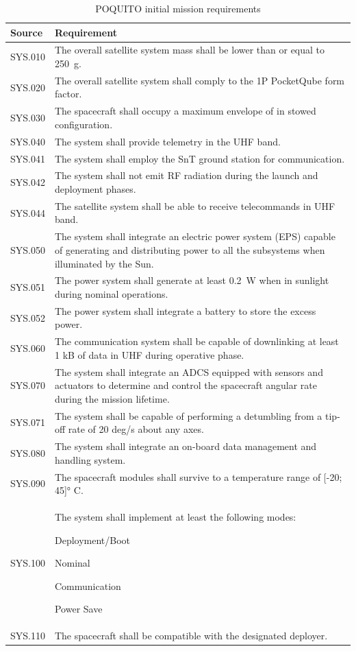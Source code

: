 \documentclass[a4paper,nobib,justified,final]{tufte-book}
\begin{document}
\begin{table}[htb]
	\begin{tabularx}{\linewidth}{@{}lX@{}}
		\toprule
		Source  & Requirement                                                                            \\ \midrule
		SYS.010 & The overall satellite system mass shall be lower than or equal to \qty{250}{\gram}.\\
		SYS.020 & The overall satellite system shall comply to the 1P PocketQube form factor.\\
		SYS.030 & The spacecraft shall occupy a maximum envelope of \qtyproduct{64 x 58 x 51.6}{\milli\meter} in stowed configuration.\\
		SYS.040 & The system shall provide telemetry in the UHF band.\\
		SYS.041 & The system shall employ the SnT ground station for communication.\\
		SYS.042 & The system shall not emit RF radiation during the launch and deployment phases.\\
		SYS.044 & The satellite system shall be able to receive telecommands in UHF band.\\
		SYS.050 & The system shall integrate an electric power system (EPS) capable of generating and distributing power to all the subsystems when illuminated by the Sun.\\
		SYS.051 & The power system shall generate at least \qty{0.2}{\watt} when in sunlight during nominal operations.\\
		SYS.052 & The power system shall integrate a battery to store the excess power.\\
		SYS.060 & The communication system shall be capable of downlinking at least 1 kB of data in UHF during operative phase.\\
		SYS.070 & The system shall integrate an ADCS equipped with sensors and actuators to determine and control the spacecraft angular rate during the mission lifetime.\\
		SYS.071 & The system shall be capable of performing a detumbling from a tip-off rate of 20 deg/s about any axes.\\
		SYS.080 & The system shall integrate an on-board data management and handling system.\\
		SYS.090 & The spacecraft modules shall survive to a temperature range of [-20; 45]° C. \\
		SYS.100 & The system shall implement at least the following modes: \begin{itemize*}\item Deployment/Boot \item Nominal\item Communication\item Power Save\end{itemize*}\\
		SYS.110 & The spacecraft shall be compatible with the designated deployer.\\
		\bottomrule
	\end{tabularx}
	\caption[POQUITO initial mission requirements]{POQUITO initial mission requirements}
\end{table}
\end{document}
